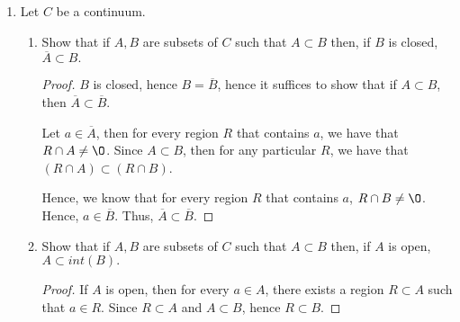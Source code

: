 \documentclass[11pt]{article}
\newcommand{\bbQ}{\mathbb{Q}}
\renewcommand{\emptyset}{\O}
\renewcommand{\_}[1]{\underline{ #1 }}
\theoremstyle{definition}
\numberwithin{equation}{subsection}
\begin{document}
\begin{enumerate}
\begin{proof}[Proof for Intersections]
Since $A \cap B \subset B$, we know that $R \subset B$, hence there exists a region, namely $R$, such that $x \in R \subset B$. Hence, $x \in int(B)$.

Thus, $x \in int(A) \cap int(B)$. This completes the first containment, i.e., $int(A\cap B) \subset [int (A)\cap int(B)]$.

Let $y \in int (A)\cap int(B)$. There exist regions $R \subset A$ and $R_0 \subset B$ such that $y \in R, y \in R_0$. Then, $S = R \cap R_0$ is a region such that $y \in S$ and $S \subset A \cap B$. Hence, $y \in int(A \cap B)$.

This completes the second containment, i.e., $[int (A)\cap int(B)] \subset int(A\cap B) $.

This completes the proof.


\renewcommand\qedsymbol{QED}
\end{proof}

\begin{proof}[Counter-Example for Unions]
Let $A, B \subset \bbQ$ such that $A = \_{01} \cup \{1\}$ and $B = \_{12}$. 

Then, $A \cup B = \_{02}$, hence $1 \in int(A \cup B), 1 \notin int(A), 1 \notin int(B)$.

\renewcommand\qedsymbol{QED}
\end{proof}

\item Let $C$ be a continuum.
\begin{enumerate}
\item Show that if $A,B$ are subsets of $C$ such that $A\subset B$ then, if $B$ is closed, $\overline{A}\subset B.$
\begin{proof}
$B$ is closed, hence $B = \overline{B}$, hence it suffices to show that if $A \subset B$, then $\overline{A} \subset \overline{B}$. 

Let $a \in \overline{A}$, then for every region $R$ that contains $a$, we have that $R \cap A \neq \emptyset$. Since $A \subset B$, then for any particular $R$, we have that $(R \cap A) \subset (R \cap B)$.

Hence, we know that for every region $R$ that contains $a$, $R \cap B \neq \emptyset$. Hence, $a \in \overline{B}$. Thus, $\overline{A} \subset \overline{B}$.

\renewcommand\qedsymbol{QED}
\end{proof}
\item Show that if $A,B$ are subsets of $C$ such that $A\subset B$ then, if $A $ is open,  $A\subset int(B).$
\begin{proof}
If $A$ is open, then for every $a \in A$, there exists a region $R \subset A$ such that $a \in R$. Since $R \subset A$ and $A \subset B$, hence $R \subset B$. 


\end{proof}
\end{enumerate}
\end{enumerate}
\end{document}
